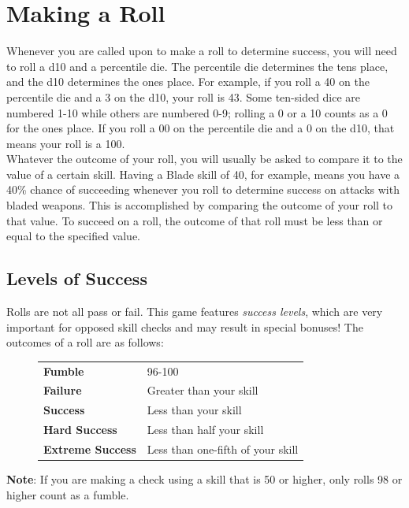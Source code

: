 \documentclass[12pt]{book}
\begin{document}
\section{Making a Roll}
Whenever you are called upon to make a roll to determine success, you will need to roll a d10 and a percentile die. The percentile die determines the tens place, and the d10 determines the ones place. For example, if you roll a 40 on the percentile die and a 3 on the d10, your roll is 43. Some ten-sided dice are numbered 1-10 while others are numbered 0-9; rolling a 0 or a 10 counts as a 0 for the ones place. If you roll a 00 on the percentile die and a 0 on the d10, that means your roll is a 100.\\

Whatever the outcome of your roll, you will usually be asked to compare it to the value of a certain skill. Having a Blade skill of 40, for example, means you have a 40\% chance of succeeding whenever you roll to determine success on attacks with bladed weapons. This is accomplished by comparing the outcome of your roll to that value. To succeed on a roll, the outcome of that roll must be less than or equal to the specified value.

\subsection{Levels of Success}
Rolls are not all pass or fail. This game features \textit{success levels}, which are very important for opposed skill checks and may result in special bonuses! The outcomes of a roll are as follows:

\begin{figure}[h]
\begin{tabular}{p{}p{}}
	\textbf{Fumble} & 96-100\\
	\textbf{Failure} & Greater than your skill\\
	\textbf{Success} & Less than your skill\\
	\textbf{Hard Success} & Less than half your skill\\
	\textbf{Extreme Success} & Less than one-fifth of your skill\\
\end{tabular}
\end{figure}

\begin{tcolorbox}
	\textbf{Note}: If you are making a check using a skill that is 50 or higher, only rolls 98 or higher count as a fumble.
\end{tcolorbox}
\end{document}
